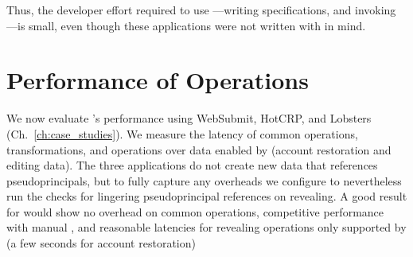 Thus, the developer effort required to use \sys---writing \sys specifications, and
invoking \sys---is small, even though these applications were not written with
\sys in mind.

\section{Performance of \sys Operations}
\label{s:eval-ops}

%
We now evaluate \sys's performance using WebSubmit,
HotCRP, and Lobsters (Ch.~\ref{ch:case_studies}).
%
%
We measure the latency of common operations, \xxing transformations,
and operations over \xxed data enabled by \sys
(\eg account restoration and editing \xxed data).
%
The three applications do not create new data that references pseudoprincipals,
but to fully capture any overheads we configure \sys to nevertheless run the
checks for lingering pseudoprincipal references on revealing.
%
A good result for \sys would show no overhead on common operations,
competitive performance with manual \xxing, and reasonable
latencies for revealing operations only supported by \sys
(\eg a few seconds for account restoration)
%


